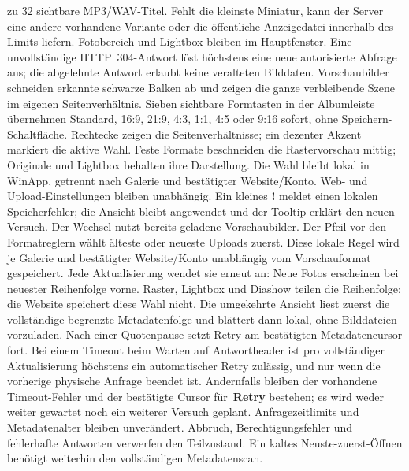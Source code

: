 \documentclass[11pt,a4paper]{article}
\newcommand{\ui}[1]{\textbf{#1}}
\begin{document}
zu 32 sichtbare MP3/WAV-Titel. Fehlt die kleinste Miniatur, kann der Server
eine andere vorhandene Variante oder die öffentliche Anzeigedatei innerhalb
des Limits liefern. Fotobereich und Lightbox bleiben im Hauptfenster.
Eine unvollständige HTTP~304-Antwort löst höchstens eine neue autorisierte
Abfrage aus; die abgelehnte Antwort erlaubt keine veralteten Bilddaten.
Vorschaubilder schneiden erkannte schwarze Balken ab und zeigen die ganze
verbleibende Szene im eigenen Seitenverhältnis. Sieben sichtbare Formtasten
in der Albumleiste übernehmen Standard, 16:9, 21:9, 4:3, 1:1, 4:5 oder 9:16
sofort, ohne Speichern-Schaltfläche. Rechtecke zeigen die Seitenverhältnisse;
ein dezenter Akzent markiert die aktive Wahl. Feste Formate beschneiden
die Rastervorschau mittig; Originale und Lightbox behalten ihre Darstellung.
Die Wahl bleibt lokal in WinApp, getrennt nach Galerie und bestätigter
Website/Konto. Web- und Upload-Einstellungen bleiben unabhängig.
Ein kleines \textbf{!} meldet einen lokalen Speicherfehler; die Ansicht bleibt
angewendet und der Tooltip erklärt den neuen Versuch. Der Wechsel nutzt
bereits geladene Vorschaubilder.
Der Pfeil vor den Formatreglern wählt älteste oder neueste Uploads zuerst.
Diese lokale Regel wird je Galerie und bestätigter Website/Konto unabhängig
vom Vorschauformat gespeichert. Jede Aktualisierung wendet sie erneut an:
Neue Fotos erscheinen bei neuester Reihenfolge vorne. Raster, Lightbox und
Diashow teilen die Reihenfolge; die Website speichert diese Wahl nicht.
Die umgekehrte Ansicht liest zuerst die vollständige begrenzte Metadatenfolge
und blättert dann lokal, ohne Bilddateien vorzuladen. Nach einer Quotenpause
setzt Retry am bestätigten Metadatencursor fort. Bei einem Timeout beim Warten auf Antwortheader ist pro vollständiger
Aktualisierung höchstens ein automatischer Retry zulässig, und nur wenn die
vorherige physische Anfrage beendet ist. Andernfalls bleiben der vorhandene
Timeout-Fehler und der bestätigte Cursor für~\ui{Retry} bestehen; es wird weder
weiter gewartet noch ein weiterer Versuch geplant. Anfragezeitlimits und
Metadatenalter bleiben unverändert. Abbruch, Berechtigungsfehler und fehlerhafte
Antworten verwerfen den Teilzustand. Ein kaltes Neuste-zuerst-Öffnen benötigt
weiterhin den vollständigen Metadatenscan.
\end{document}
